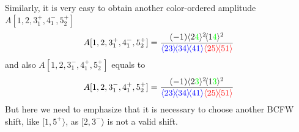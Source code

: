 \documentclass[12pt]{article}
\numberwithin{equation}{section}
\newcommand{\mdavg}[2]{\langle #1 \rangle\!\langle #2 \rangle}
\newcommand{\avg}[1]{\langle #1 \rangle}
\begin{document}
\par
Similarly, it is very easy to obtain another color-ordered amplitude $A[1,2,3_1^+,4_1^-,5_2^+]$
\begin{align}
    A[1,2,3_1^+,4_1^-,5_2^+]=
    \frac{(-1)\avg{2\textcolor{green}{4}}^2\!\avg{1\textcolor{green}{4}}^2}{\textcolor{blue}{\mdavg{23}{34}\!\avg{41}}\textcolor{red}{\mdavg{25}{51}}}
\end{align}
and also $A[1,2,3_1^-,4_1^+,5_2^+]$ equals to
\begin{equation}
    A[1,2,3_1^-,4_1^+,5_2^+]=
    \frac{(-1)\avg{2\textcolor{green}{3}}^2\!\avg{1\textcolor{green}{3}}^2}{\textcolor{blue}{\mdavg{23}{34}\!\avg{41}}\textcolor{red}{\mdavg{25}{51}}}
\end{equation}
But here we need to emphasize that it is necessary to choose another BCFW shift, like $[1,5^+ \rangle$, as $[2,3^- \rangle$ is not a valid shift. 
\end{document}

